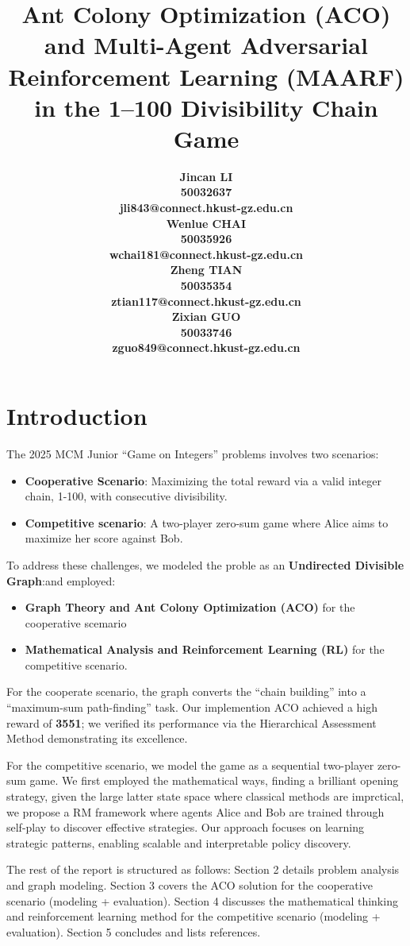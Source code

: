 \documentclass[twocolumn, a4paper]{article}
\title{Ant Colony Optimization (ACO) and Multi-Agent Adversarial Reinforcement Learning (MAARF) in the 1--100 Divisibility Chain Game}
\author{
    \begin{minipage}[t]{0.23\textwidth}
        \centering
        \small\bfseries Jincan LI\\
        \tiny 50032637\\
        \tiny jli843@connect.hkust-gz.edu.cn
    \end{minipage}
    \hfill
    \begin{minipage}[t]{0.23\textwidth}
        \centering
        \small\bfseries Wenlue CHAI\\
        \tiny 50035926\\
        \tiny wchai181@connect.hkust-gz.edu.cn
    \end{minipage}
    \hfill
    \begin{minipage}[t]{0.23\textwidth}
        \centering
        \small\bfseries Zheng TIAN\\
        \tiny 50035354\\
        \tiny ztian117@connect.hkust-gz.edu.cn
    \end{minipage}
    \hfill
    \begin{minipage}[t]{0.23\textwidth}
        \centering
        \small\bfseries Zixian GUO\\
        \tiny 50033746\\
        \tiny zguo849@connect.hkust-gz.edu.cn
    \end{minipage}
}
\date{} %
\begin{document}
\maketitle


\section{Introduction}
The 2025 MCM Junior ``Game on Integers'' problems involves two scenarios: 
\begin{itemize}
    \item \textbf{Cooperative Scenario}: Maximizing the total reward via a valid integer chain, 1-100, with consecutive divisibility.
    \item \textbf{Competitive scenario}: A two-player zero-sum game where Alice aims to maximize her score against Bob.
\end{itemize}
To address these challenges, we modeled the proble as an \textbf{Undirected Divisible Graph}:and employed:
\begin{itemize}
    \item \textbf{Graph Theory and Ant Colony Optimization (ACO)} for the cooperative scemario 
    \item \textbf{Mathematical Analysis and Reinforcement Learning (RL)} for the competitive scenario.
\end{itemize}

For the cooperate scenario, the graph converts the ``chain building'' into a ``maximum-sum path-finding'' task. Our implemention ACO achieved a high reward of \textbf{3551}; we verified its performance via the Hierarchical Assessment Method demonstrating its excellence.

For the competitive scenario, we model the game as a sequential two-player zero-sum game. We first employed the mathematical ways, finding a brilliant opening strategy, given the large latter state space where classical methods are imprctical, we propose a RM framework where agents Alice and Bob are trained through self-play to discover effective strategies. Our approach focuses on learning strategic patterns, enabling scalable and interpretable policy discovery.

The rest of the report is structured as follows: Section 2 details problem analysis and graph modeling. Section 3 covers the ACO solution for the cooperative scenario (modeling + evaluation). Section 4 discusses the mathematical thinking and reinforcement learning method for the competitive scenario (modeling + evaluation). Section 5 concludes and lists references.
\end{document}
